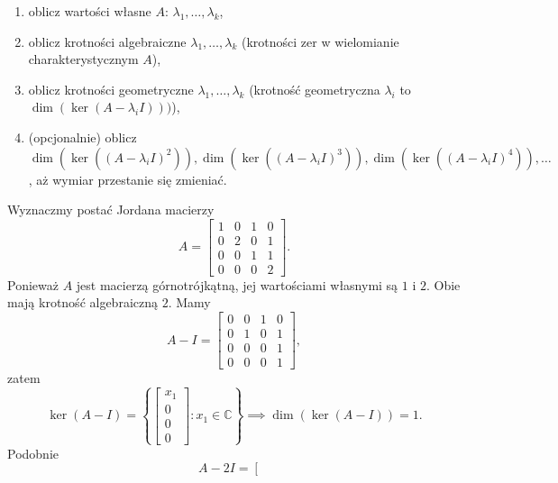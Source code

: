 
\begin{enumerate}
	\item oblicz wartości własne $A$: $\lambda_1, \dots, \lambda_k$,
	\item oblicz krotności algebraiczne $\lambda_1, \dots, \lambda_k$
		(krotności zer w wielomianie charakterystycznym $A$),
	\item oblicz krotności geometryczne $\lambda_1, \dots, \lambda_k$
		(krotność geometryczna $\lambda_i$ to $\dim(\ker(A - \lambda_i I)))$),
	\item (opcjonalnie) oblicz $\dim(\ker((A - \lambda_i I)^2)), \dim(\ker((A - \lambda_i I)^3)), \dim(\ker((A - \lambda_i I)^4)), \dots$, aż wymiar przestanie się zmieniać.
\end{enumerate}

\begin{example}
	Wyznaczmy postać Jordana macierzy
	\begin{equation}
			A = \left[\begin{matrix}
				1 & 0 & 1 & 0 \\
				0 & 2 & 0 & 1 \\
				0 & 0 & 1 & 1 \\
				0 & 0 & 0 & 2
			\end{matrix}\right].
		\end{equation}
		Ponieważ $A$ jest macierzą górnotrójkątną,
			jej wartościami własnymi są $1$ i $2$.
		Obie mają krotność algebraiczną $2$.
	Mamy
	\begin{equation}
		A - I = \left[\begin{matrix}
			0 & 0 & 1 & 0 \\
			0 & 1 & 0 & 1 \\
			0 & 0 & 0 & 1 \\
			0 & 0 & 0 & 1
		\end{matrix}\right],
	\end{equation}
	zatem
	\begin{equation}
		\ker(A - I) = \left\{\left[\begin{matrix}
			x_1 \\
			0 \\
			0 \\
			0
		\end{matrix}\right] : x_1 \in \mathbb{C}\right\}
		\implies
		\dim(\ker(A - I)) = 1.
	\end{equation}
	Podobnie
	\begin{equation}
		A - 2I = \left[\begin{matrix}

\end{matrix}
\end{equation}
\end{example}
